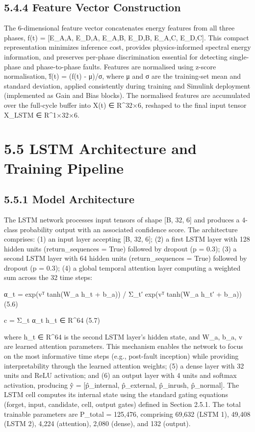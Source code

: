 \subsection{5.4.4  Feature Vector Construction}
The 6-dimensional feature vector concatenates energy features from all three phases, f(t) = [E\_A,A, E\_D,A, E\_A,B, E\_D,B, E\_A,C, E\_D,C]. This compact representation minimizes inference cost, provides physics-informed spectral energy information, and preserves per-phase discrimination essential for detecting single-phase and phase-to-phase faults. Features are normalised using z-score normalisation, f̂(t) = (f(t) - μ)/σ, where μ and σ are the training-set mean and standard deviation, applied consistently during training and Simulink deployment (implemented as Gain and Bias blocks). The normalised features are accumulated over the full-cycle buffer into X(t) ∈ R^{32×6}, reshaped to the final input tensor X\_LSTM ∈ R^{1×32×6}.


\section{5.5  LSTM Architecture and Training Pipeline}

\subsection{5.5.1  Model Architecture}
The LSTM network processes input tensors of shape [B, 32, 6] and produces a 4-class probability output with an associated confidence score. The architecture comprises: (1) an input layer accepting [B, 32, 6]; (2) a first LSTM layer with 128 hidden units (return\_sequences = True) followed by dropout (p = 0.3); (3) a second LSTM layer with 64 hidden units (return\_sequences = True) followed by dropout (p = 0.3); (4) a global temporal attention layer computing a weighted sum across the 32 time steps:

α\_t = exp(vᵀ tanh(W\_a h\_t + b\_a)) / Σ\_{t′} exp(vᵀ tanh(W\_a h\_{t′} + b\_a))	(5.6)

c = Σ\_t α\_t h\_t  ∈ R^{64}	(5.7)

where h\_t ∈ R^{64} is the second LSTM layer's hidden state, and W\_a, b\_a, v are learned attention parameters. This mechanism enables the network to focus on the most informative time steps (e.g., post-fault inception) while providing interpretability through the learned attention weights; (5) a dense layer with 32 units and ReLU activation; and (6) an output layer with 4 units and softmax activation, producing ŷ = [p̂\_internal, p̂\_external, p̂\_inrush, p̂\_normal]. The LSTM cell computes its internal state using the standard gating equations (forget, input, candidate, cell, output gates) defined in Section 2.5.1. The total trainable parameters are P\_total = 125,476, comprising 69,632 (LSTM 1), 49,408 (LSTM 2), 4,224 (attention), 2,080 (dense), and 132 (output).

